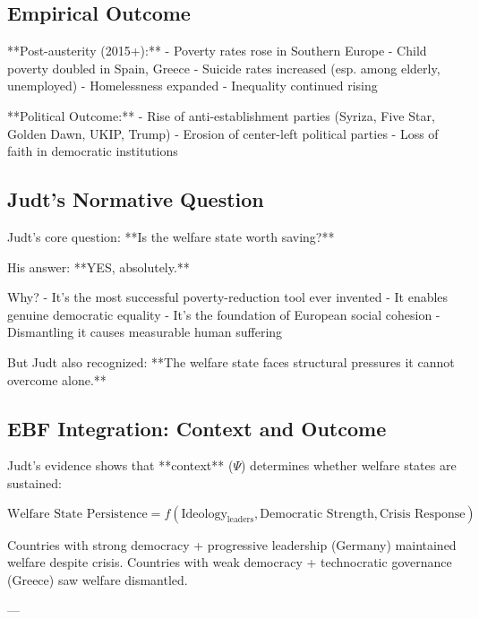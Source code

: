\subsection{Empirical Outcome}

**Post-austerity (2015+):**
- Poverty rates rose in Southern Europe
- Child poverty doubled in Spain, Greece
- Suicide rates increased (esp. among elderly, unemployed)
- Homelessness expanded
- Inequality continued rising

**Political Outcome:**
- Rise of anti-establishment parties (Syriza, Five Star, Golden Dawn, UKIP, Trump)
- Erosion of center-left political parties
- Loss of faith in democratic institutions

\subsection{Judt's Normative Question}

Judt's core question: **Is the welfare state worth saving?**

His answer: **YES, absolutely.**

Why?
- It's the most successful poverty-reduction tool ever invented
- It enables genuine democratic equality
- It's the foundation of European social cohesion
- Dismantling it causes measurable human suffering

But Judt also recognized: **The welfare state faces structural pressures it cannot overcome alone.**

\subsection{EBF Integration: Context and Outcome}

Judt's evidence shows that **context** ($\Psi$) determines whether welfare states are sustained:

\begin{equation}
\text{Welfare State Persistence} = f(\text{Ideology}_{\text{leaders}}, \text{Democratic Strength}, \text{Crisis Response})
\end{equation}

Countries with strong democracy + progressive leadership (Germany) maintained welfare despite crisis.
Countries with weak democracy + technocratic governance (Greece) saw welfare dismantled.

---

\clearpage


